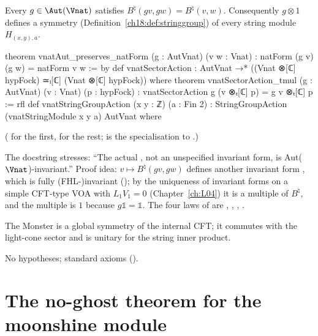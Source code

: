 \begin{theorem}\label{ch18:thm:sectoraction}
Every $g\in\Aut(\Vnat)$ satisfies $B^\natural(gv,gw)=B^\natural(v,w)$.  Consequently $g\otimes1$ defines a
symmetry (Definition~\ref{ch18:def:stringgroup}) of every string module $H_{(x,y),a}$.
\end{theorem}
\begin{leancode}
theorem vnatAut_preserves_natForm (g : AutVnat) (v w : Vnat) :
    natForm (g v) (g w) = natForm v w := by
def vnatSectorAction : AutVnat →* ((Vnat ⊗[ℂ] hypFock) ≃ₗ[ℂ] (Vnat ⊗[ℂ] hypFock)) where
theorem vnatSectorAction_tmul (g : AutVnat) (v : Vnat) (p : hypFock) :
    vnatSectorAction g (v ⊗ₜ[ℂ] p) = g v ⊗ₜ[ℂ] p := rfl
def vnatStringGroupAction (x y : ℤ) (a : Fin 2) :
    StringGroupAction (vnatStringModule x y a) AutVnat where
\end{leancode}
( for the first,
 for the rest;  is the
specialisation to .)
\begin{dictionary}
The docstring stresses: ``The actual , not an unspecified invariant form, is
Aut($\Vnat$)-invariant.''  Proof idea: $v\mapsto B^\natural(gv,gw)$ defines another invariant form
, which is fully (FHL-)invariant (); by the
uniqueness of invariant forms on a simple CFT-type VOA with $L_1V_1=0$ (Chapter~\ref{ch:L04}) it is a
multiple of $B^\natural$, and the multiple is $1$ because $g\mathbb 1=\mathbb 1$.  The four laws of
 are , ,
, .
\end{dictionary}
\begin{physics}
The Monster is a global symmetry of the internal CFT; it commutes with the light-cone sector and is
unitary for the string inner product.
\end{physics}
\begin{status}No hypotheses; standard axioms ().\end{status}

\section{The no-ghost theorem for the moonshine module}\label{ch18:sec:vnatnoghost}

